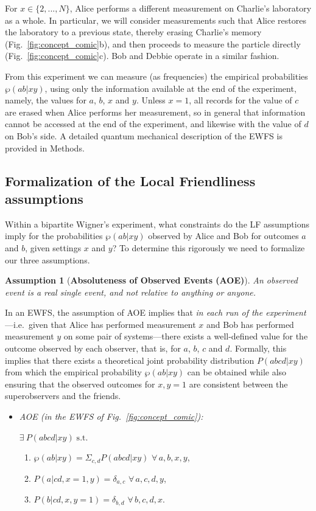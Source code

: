 \documentclass[aps,prx,twocolumn,superscriptaddress]{revtex4-1}
\theoremstyle{plain}
\newtheorem{ass}{Assumption}
\newcommand{\ie}{i.e.}
\begin{document}
For $x\in\{2,...,N\}$, Alice performs a different measurement on Charlie's laboratory as a whole. In particular, we will consider measurements such that Alice restores the laboratory to a previous state, thereby erasing Charlie's memory (Fig.~\ref{fig:concept_comic}b), and then proceeds to measure the particle directly (Fig.~\ref{fig:concept_comic}c). Bob and Debbie operate in a similar fashion.

From this experiment we can measure (as frequencies) the empirical probabilities $\wp(ab|xy)$, using only the information available at the end of the experiment, namely, the values for $a$, $b$, $x$ and $y$. Unless $x=1$, all records for the value of $c$ are erased when Alice performs her measurement, so in general that information cannot be accessed at the end of the experiment, and likewise with the value of $d$ on Bob's side. A detailed quantum mechanical description of the EWFS is provided in Methods.

\subsection{Formalization of the {Local Friendliness} assumptions}\label{sec:formalization}

Within a bipartite Wigner's experiment, what constraints do the LF assumptions imply for the probabilities $\wp(ab|xy)$ observed by Alice and Bob for outcomes $a$ and $b$, given settings $x$ and $y$? To determine this rigorously we need to formalize our three assumptions. 

\begin{ass}[\textbf{{Absoluteness of Observed Events} (AOE)}] \label{defin:AF}
An observed event is a real single event, and not relative to anything or anyone.
\end{ass}

In an EWFS, the assumption of AOE implies that \emph{in each run of the experiment}---\ie~given that Alice has performed measurement $x$ and Bob has performed measurement $y$ on some pair of systems---there exists a well-defined value for the outcome observed by each observer, that is, for $a$, $b$, $c$ and $d$. Formally, this implies that there exists a theoretical joint probability distribution $P(abcd|xy)$ from which the empirical probability $\wp(ab|xy)$ can be obtained while also ensuring that the observed outcomes for $x,y=1$ are consistent between the superobservers and the friends.
\begin{itemize}
\item \textit{{AOE} (in the EWFS of Fig.~\ref{fig:concept_comic}):} 

$\exists~P(abcd|xy) \; \mathrm{s.t.}$
\begin{enumerate}
    \item[i)] $\wp(ab|xy)=\Sigma_{c,d}P(abcd|xy)$ $\forall \, a,b,x,y$,
    \item[ii)]  $P(a|cd,x=1,y)=\delta_{a,c}$ $\forall \, a,c,d,y$,
    \item[iii)] $P(b|cd,x,y=1)=\delta_{b,d}$ $\forall \, b,c,d,x$.
\end{enumerate}
\end{itemize}
\end{document}
